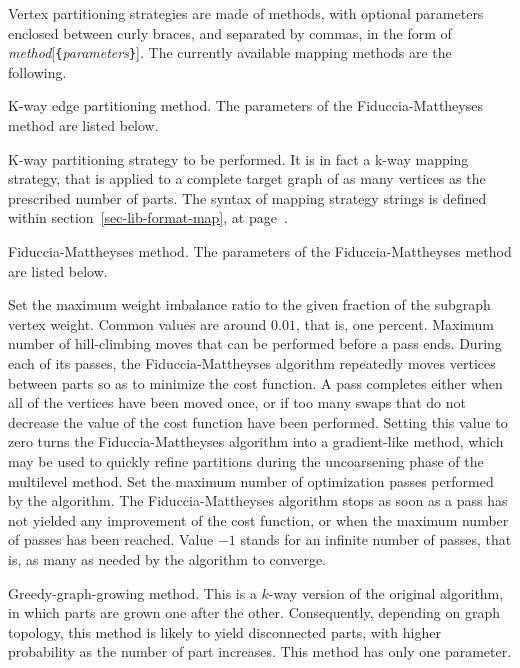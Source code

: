 Vertex partitioning strategies are made of methods, with optional
parameters enclosed between curly braces, and separated by commas, in
the form of {\it method\/}{[{\tt \{}{\it parameters\/}{\tt \}}]}\enspace.
The currently available mapping methods are the following.

\begin{itemize}
\iteme[{\tt e}]
K-way edge partitioning method. The parameters of the Fiduccia-Mattheyses method
are listed below.
\begin{itemize}
\iteme[{\tt strat=}{\it strat}]
K-way partitioning strategy to be performed. It is in fact a k-way
mapping strategy, that is applied to a complete target graph of as
many vertices as the prescribed number of parts. The syntax of mapping
strategy strings is defined within section~\ref{sec-lib-format-map},
at page~\pageref{sec-lib-format-map}.
\end{itemize}
\iteme[{\tt f}]
Fiduccia-Mattheyses method. The parameters of the Fiduccia-Mattheyses method
are listed below.
\begin{itemize}
\iteme[{\tt bal=}{\it rat}]
Set the maximum weight imbalance ratio to the given fraction of
the subgraph vertex weight. Common values are around $0.01$, that
is, one percent.
\iteme[{\tt move=}{\it nbr}]
Maximum number of hill-climbing moves that can be performed before a
pass ends. During each of its passes, the Fiduccia-Mattheyses
algorithm repeatedly moves vertices between parts so as to
minimize the cost function. A pass completes either when all of the
vertices have been moved once, or if too many swaps that do not
decrease the value of the cost function have been performed. Setting
this value to zero turns the Fiduccia-Mattheyses algorithm into a
gradient-like method, which may be used to quickly refine partitions
during the uncoarsening phase of the multilevel method.
\iteme[{\tt pass=}{\it nbr}]
Set the maximum number of optimization passes performed by the
algorithm. The Fiduccia-Mattheyses algorithm stops as soon as a pass
has not yielded any improvement of the cost function, or when the
maximum number of passes has been reached. Value $-1$ stands for an
infinite number of passes, that is, as many as needed by the algorithm
to converge.
\end{itemize}
\iteme[{\tt h}]
Greedy-graph-growing method. This is a $k$-way version of the
original algorithm, in which parts are grown one after the
other. Consequently, depending on graph topology, this method is
likely to yield disconnected parts, with higher probability as the
number of part increases. This method has only one parameter.

\end{itemize}

